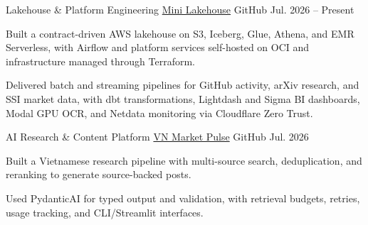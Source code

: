 
\begin{cventries}
  \cventry
    {Lakehouse \& Platform Engineering}
    {\href{https://github.com/ToGiaBaoKDL/mini-lakehouse}{Mini Lakehouse}}
    {GitHub}
    {Jul. 2026 -- Present}
    {
      \begin{cvitems}
        \item {Built a contract-driven AWS lakehouse on S3, Iceberg, Glue, Athena, and EMR Serverless, with Airflow and platform services self-hosted on OCI and infrastructure managed through Terraform.}
        \item {Delivered batch and streaming pipelines for GitHub activity, arXiv research, and SSI market data, with dbt transformations, Lightdash and Sigma BI dashboards, Modal GPU OCR, and Netdata monitoring via Cloudflare Zero Trust.}
      \end{cvitems}
    }

  \cventry
    {AI Research \& Content Platform}
    {\href{https://github.com/ToGiaBaoKDL/vn-market-pulse}{VN Market Pulse}}
    {GitHub}
    {Jul. 2026}
    {
      \begin{cvitems}
        \item {Built a Vietnamese research pipeline with multi-source search, deduplication, and reranking to generate source-backed posts.}
        \item {Used PydanticAI for typed output and validation, with retrieval budgets, retries, usage tracking, and CLI/Streamlit interfaces.}
      \end{cvitems}
    }
\end{cventries}
